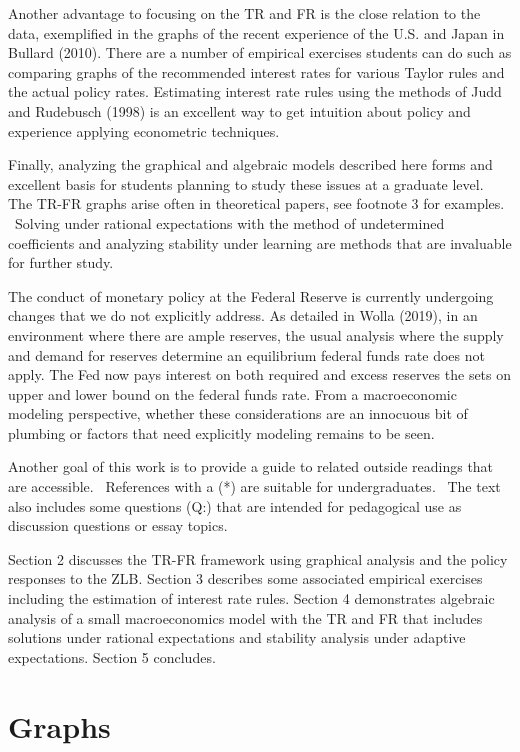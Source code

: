 \documentclass{article}
\begin{document}
\begin{doublespace}
Another advantage to focusing on the TR and FR is the close relation to the
data, exemplified in the graphs of the recent experience of the U.S. and
Japan in Bullard (2010). There are a number of empirical exercises students
can do such as comparing graphs of the recommended interest rates for
various Taylor rules and the actual policy rates. Estimating interest rate
rules using the methods of Judd and Rudebusch (1998) is an excellent way to
get intuition about policy and experience applying econometric techniques.

Finally, analyzing the graphical and algebraic models described here forms
and excellent basis for students planning to study these issues at a
graduate level. The TR-FR graphs arise often in theoretical papers, see
footnote 3 for examples. \ Solving under rational expectations with the
method of undetermined coefficients and analyzing stability under learning
are methods that are invaluable for further study.

The conduct of monetary policy at the Federal Reserve is currently
undergoing changes that we do not explicitly address. As detailed in Wolla
(2019), in an environment where there are ample reserves, the usual analysis
where the supply and demand for reserves determine an equilibrium federal
funds rate does not apply. The Fed now pays interest on both required and
excess reserves the sets on upper and lower bound on the federal funds rate.
From a macroeconomic modeling perspective, whether these considerations are
an innocuous bit of plumbing or factors that need explicitly modeling
remains to be seen.

Another goal of this work is to provide a guide to related outside readings
that are accessible. \ References with a (*) are suitable for
undergraduates. \ The text also includes some questions (Q:) that are
intended for pedagogical use as discussion questions or essay topics.

Section 2 discusses the TR-FR framework using graphical analysis and the
policy responses to the ZLB. Section 3 describes some associated empirical
exercises including the estimation of interest rate rules. Section 4
demonstrates algebraic analysis of a small macroeconomics model with the TR
and FR that includes solutions under rational expectations and stability
analysis under adaptive expectations. Section 5 concludes.

\section{Graphs}


\end{doublespace}
\end{document}
